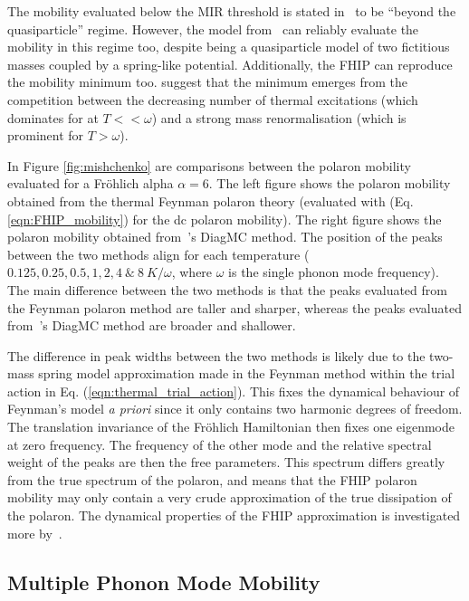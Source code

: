 The mobility evaluated below the MIR threshold is stated in~\cite{mishchenko_polaron_2019} to be ``beyond the quasiparticle'' regime. However, the model from~\cite{feynman_mobility_1962} can reliably evaluate the mobility in this regime too, despite being a quasiparticle model of two fictitious masses coupled by a spring-like potential. Additionally, the FHIP can reproduce the mobility minimum too. \cite{mishchenko_polaron_2019} suggest that the minimum emerges from the competition between the decreasing number of thermal excitations (which dominates for at $T << \omega$) and a strong mass renormalisation (which is prominent for $T > \omega$). 

In Figure \ref{fig:mishchenko} are comparisons between the polaron mobility evaluated for a Fr\"ohlich alpha $\alpha = 6$. The left figure shows the polaron mobility obtained from the thermal Feynman polaron theory (evaluated with (Eq. \ref{eqn:FHIP_mobility}) for the dc polaron mobility). The right figure shows the polaron mobility obtained from~\cite{mishchenko_polaron_2019}'s DiagMC method. The position of the peaks between the two methods align for each temperature ($0.125, 0.25, 0.5, 1, 2, 4\  \&\ 8\ K/\omega$, where $\omega$ is the single phonon mode frequency). The main difference between the two methods is that the peaks evaluated from the Feynman polaron method are taller and sharper, whereas the peaks evaluated from~\cite{mishchenko_polaron_2019}'s DiagMC method are broader and shallower. 

The difference in peak widths between the two methods is likely due to the two-mass spring model approximation made in the Feynman method within the trial action in Eq. (\ref{eqn:thermal_trial_action}). This fixes the dynamical behaviour of Feynman's model \emph{a priori} since it only contains two harmonic degrees of freedom. The translation invariance of the Fr\"ohlich Hamiltonian then fixes one eigenmode at zero frequency. The frequency of the other mode and the relative spectral weight of the peaks are then the free parameters. This spectrum differs greatly from the true spectrum of the polaron, and means that the FHIP polaron mobility may only contain a very crude approximation of the true dissipation of the polaron. The dynamical properties of the FHIP approximation is investigated more by~\cite{sels_dynamic_2016}.

\subsection{Multiple Phonon Mode Mobility}
\label{subsec:3-1-3}

